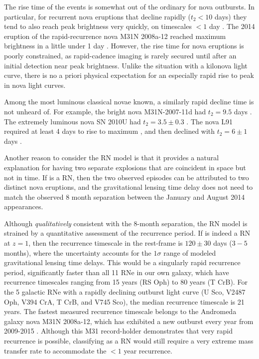 The rise time of the \spock events is somewhat out of the ordinary for
nova outbursts.  In particular, for recurrent nova eruptions that
decline rapidly ($t_2<10$ days) they tend to also reach peak
brightness very quickly, on timescales $<1$ day
\citep{Schaefer:2010}. The 2014 eruption of the rapid-recurrence nova
M31N 2008a-12 reached maximum brightness in a little under 1 day
\citep{Darnley:2015}.  However, the rise time for nova eruptions is
poorly constrained, as rapid-cadence imaging is rarely secured until
after an initial detection near peak brightness.  Unlike the situation
with a kilonova light curve, there is no a priori physical expectation
for an especially rapid rise to peak in nova light curves.

Among the most luminous classical novae known, a similarly rapid
decline time is not unheard of.  For example, the bright nova
M31N-2007-11d had $t_2 = 9.5$ days \citep{Shafter:2009}.  The
extremely luminous nova SN 2010U had $t_2 = 3.5 \pm 0.3$
\citep{Czekala:2013}.  The nova L91 required at least 4 days to rise
to maximum \citep{Shafter:2009}, and then declined with $t_2 = 6 \pm
1$ days \citep{DellaValle:1991, Williams:1994, Schwarz:2001}.

Another reason to consider the RN model is that it provides a
natural explanation for having two separate explosions that are
coincident in space but not in time.  If \spock is a RN, then the two
observed episodes can be attributed to two distinct nova eruptions,
and the gravitational lensing time delay does not need to match the
observed 8 month separation between the January and August 2014
appearances.

Although {\it qualitatively} consistent with the 8-month separation,
the RN model is strained by a quantitative assessment of the
recurrence period. If \spock is indeed a RN at $z=1$, then the
recurrence timescale in the rest-frame is $120\pm30$ days ($3-5$
months), where the uncertainty accounts for the $1\sigma$ range of
modeled gravitational lensing time delays.  This would be a singularly
rapid recurrence period, significantly faster than all 11 RNe in our
own galaxy, which have recurrence timescales ranging from 15 years (RS
Oph) to 80 years (T CrB). For the 5 galactic RNe with a rapidly
declining outburst light curve (U Sco, V2487 Oph, V394 CrA, T CrB, and
V745 Sco), the median recurrence timescale is 21 years.  The fastest
measured recurrence timescale belongs to the Andromeda galaxy nova
M31N 2008a-12, which has exhibited a new outburst every year from
2009-2015
\citep{Tang:2014,Darnley:2014,Darnley:2015,Henze:2015,Henze:2015a}. Although
this M31 record-holder demonstrates that very rapid recurrence is
possible, classifying \spock as a RN would still require a very
extreme mass transfer rate to accommodate the $<1$ year recurrence.


